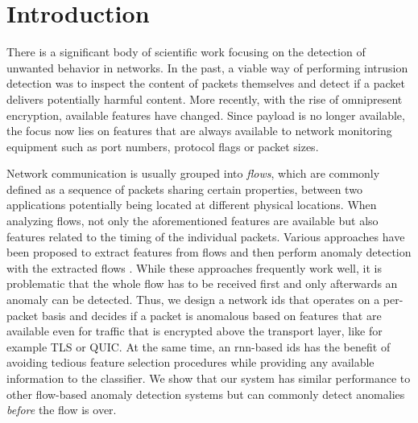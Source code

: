 \documentclass[conference]{IEEEtran}
\begin{document}
\maketitle

\section{Introduction}

There is a significant body of scientific work focusing on the detection of unwanted behavior in networks. In the past, a viable way of performing intrusion detection was to inspect the content of packets themselves and detect if a packet delivers potentially harmful content. More recently, with the rise of omnipresent encryption, available features have changed. Since payload is no longer available, the focus now lies on features that are always available to network monitoring equipment such as port numbers, protocol flags or packet sizes.

Network communication is usually grouped into \textit{flows}, which are commonly defined as a sequence of packets sharing certain properties, between two applications potentially being located at different physical locations.
When analyzing flows, not only the aforementioned features are available but also features related to the timing of the individual packets. %
Various approaches have been proposed to extract features from flows and then perform anomaly detection with the extracted flows \cite{meghdouri_analysis_2018}.
While these approaches frequently work well, it is problematic that the whole flow has to be received first and only afterwards an anomaly can be detected. Thus, we design a network \gls{ids} that operates on a per-packet basis and decides if a packet is anomalous based on features that are available even for traffic that is encrypted above the transport layer, like for example TLS or QUIC.
At the same time, an \gls{rnn}-based \gls{ids} has the benefit of avoiding tedious feature selection procedures while providing any available information to the classifier.
We show that our system has similar performance to other flow-based anomaly detection systems but can commonly detect anomalies \textit{before} the flow is over.
\end{document}
